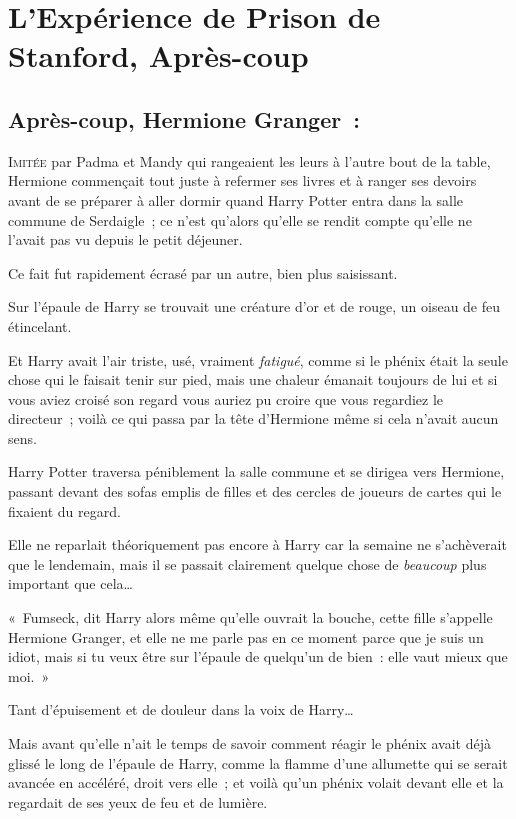 \chapter{L'Expérience de Prison de Stanford, Après-coup}

\section{Après-coup, Hermione Granger~:}

\lettrine{I}{mitée} par Padma et Mandy qui rangeaient les leurs à l'autre bout de la table, Hermione commençait tout juste à refermer ses livres et à ranger ses devoirs avant de se préparer à aller dormir quand Harry Potter entra dans la salle commune de Serdaigle~; ce n'est qu'alors qu'elle se rendit compte qu'elle ne l'avait pas vu depuis le petit déjeuner.

Ce fait fut rapidement écrasé par un autre, bien plus saisissant.

Sur l'épaule de Harry se trouvait une créature d'or et de rouge, un oiseau de feu étincelant.

Et Harry avait l'air triste, usé, vraiment \emph{fatigué}, comme si le phénix était la seule chose qui le faisait tenir sur pied, mais une chaleur émanait toujours de lui et si vous aviez croisé son regard vous auriez pu croire que vous regardiez le directeur~; voilà ce qui passa par la tête d'Hermione même si cela n'avait aucun sens.

Harry Potter traversa péniblement la salle commune et se dirigea vers Hermione, passant devant des sofas emplis de filles et des cercles de joueurs de cartes qui le fixaient du regard.

Elle ne reparlait théoriquement pas encore à Harry car la semaine ne s'achèverait que le lendemain, mais il se passait clairement quelque chose de \emph{beaucoup} plus important que cela…

«~Fumseck, dit Harry alors même qu'elle ouvrait la bouche, cette fille s'appelle Hermione Granger, et elle ne me parle pas en ce moment parce que je suis un idiot, mais si tu veux être sur l'épaule de quelqu'un de bien~: elle vaut mieux que moi.~»

Tant d'épuisement et de douleur dans la voix de Harry…

Mais avant qu'elle n'ait le temps de savoir comment réagir le phénix avait déjà glissé le long de l'épaule de Harry, comme la flamme d'une allumette qui se serait avancée en accéléré, droit vers elle~; et voilà qu'un phénix volait devant elle et la regardait de ses yeux de feu et de lumière.

